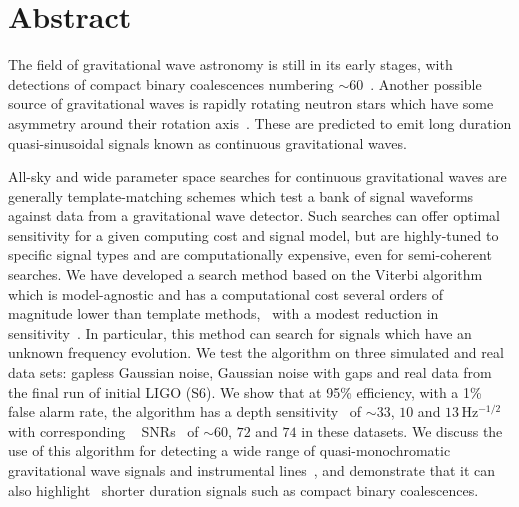 \chapter{Abstract}

The field of gravitational wave astronomy is still in its early stages, with
detections of compact binary coalescences numbering $\sim
60$~. Another possible source of
gravitational waves is rapidly rotating neutron stars which have some asymmetry
around their rotation axis~.
These are predicted to emit long duration quasi-sinusoidal signals known as
continuous gravitational waves.

All-sky and wide parameter space searches for continuous gravitational waves
are generally template-matching schemes which test a bank of signal waveforms
against data from a gravitational wave detector.  Such searches can offer
optimal~ sensitivity for a given computing cost and signal
model, but are highly-tuned to specific signal types and are computationally
expensive, even for semi-coherent~ searches. We have developed a search method based on the Viterbi
algorithm which is model-agnostic and has a computational cost several orders
of magnitude lower than template methods,~ with a modest reduction
in sensitivity~. In particular, this method can search for
signals which have an unknown frequency evolution. We test the algorithm on
three simulated and real data sets: gapless Gaussian noise, Gaussian noise with
gaps and real data from the final run of initial LIGO (S6). We show that at
95\% efficiency, with a 1\% false alarm rate, the algorithm has a depth
sensitivity~ of $\sim 33$, $10$ and $13$\,Hz$^{-1/2}$ with
corresponding ~ SNRs~ of $\sim 60$, $72$ and $74$ in these datasets. We discuss
the use of this algorithm for detecting a wide range of quasi-monochromatic
gravitational wave signals and instrumental lines~, and
demonstrate that it can also highlight~ shorter duration signals such as compact binary coalescences.


